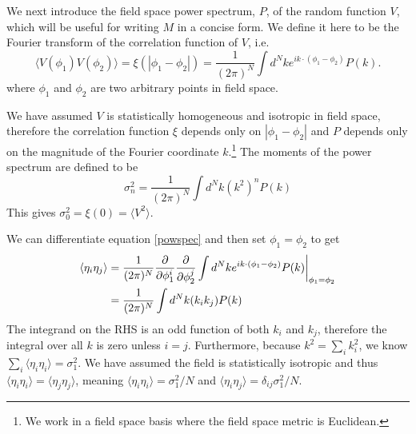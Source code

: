 \documentclass[12pt]{article}
\begin{document}
We next introduce the field space power spectrum, $P$, of the random function $V$, which will be useful for writing $M$ in a concise form. We define it here to be the Fourier transform of the correlation function of $V$, i.e.
%
\begin{equation}\label{powspec}
\langle V(\phi_1) V(\phi_2) \rangle = \xi(|\phi_1-\phi_2|)= \frac{1}{(2\pi)^N} \int d^Nk e^{i k \cdot (\phi_1-\phi_2)} P(k).
\end{equation}
%
where $\phi_1$ and $\phi_2$ are two arbitrary points in field space.

We have assumed $V$ is statistically homogeneous and isotropic in field space, therefore the correlation function $\xi$ depends only on $|\phi_1-\phi_2|$ and  $P$ depends only on the magnitude of the Fourier coordinate $k$.\footnote{We work in a field space basis where the field space metric is Euclidean.} The moments of the power spectrum are defined to be
%
\begin{equation} \label{moments}
\sigma_n^2 = \frac{1}{(2\pi)^N}\int d^Nk (k^{2})^n P(k)
\end{equation}
%
This gives $\sigma_0^2=\xi(0)=\langle V^2 \rangle$.

We can differentiate equation \eqref{powspec} and then set $\phi_1 = \phi_2$ to get
%
\begin{align*}
\langle \eta_{i}\eta_{j}\rangle &= \frac{1}{(2\pi)^N} \frac{\partial}{\partial \phi_1^i}\frac{\partial}{\partial \phi_2^j} \int d^Nk e^{i k \cdot (\phi_1-\phi_2)} P(k)\bigg{|}_{\phi_1=\phi_2}\\
&= \frac{1}{(2\pi)^N}\int d^Nk (k_i k_j) P(k)
\end{align*}
%
The integrand on the RHS is an odd function of both $k_i$ and $k_j$, therefore the integral over all $k$ is zero unless $i=j$. Furthermore, because $k^2 = \sum_i k_i^2$, we know  $\sum_i \langle \eta_{i}\eta_{i}\rangle = \sigma_1^2$. We have assumed the field is statistically isotropic and thus $\langle \eta_{i}\eta_{i}\rangle=\langle \eta_{j}\eta_{j}\rangle$, meaning $\langle \eta_{i}\eta_{i}\rangle=\sigma_1^2/N$ and $\langle \eta_{i}\eta_{j}\rangle=\delta_{ij}\sigma_1^2/N$.

\end{document}
